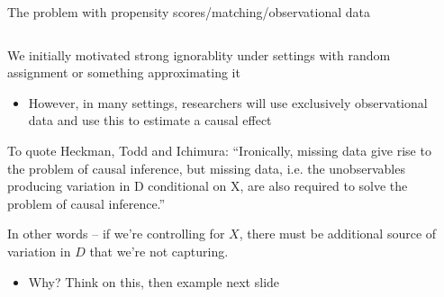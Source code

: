 \documentclass[notes,11pt, aspectratio=169]{beamer}
\newenvironment{wideitemize}{\itemize\addtolength{\itemsep}{10pt}}{\enditemize}
\begin{document}
\begin{frame}{The problem with propensity scores/matching/observational data}
\begin{columns}[T] %
\begin{column}{.7\textwidth}
  \begin{wideitemize}
  \item We initially motivated strong ignorablity under settings with
    random assignment or something approximating it
    \begin{itemize}
    \item However, in many settings, researchers will use exclusively
      observational data and use this to estimate a causal effect
    \end{itemize}
  \item To quote Heckman, Todd and Ichimura: ``Ironically, missing data give rise to the problem of causal inference, but missing data, i.e. the unobservables producing variation in D conditional on X, are also required to solve the problem of causal inference.''
  \item In other words -- if we're controlling for $X$, there must be additional source of variation in $D$ that we're not capturing.
    \begin{itemize}
    \item Why? Think on this, then example next slide
    \end{itemize}
    \end{wideitemize}
\end{column}%
\hfill%
\begin{column}{.4\textwidth}
  \begin{center}
  \end{center}
\end{column}%
\end{columns}
\end{frame}
\end{document}
